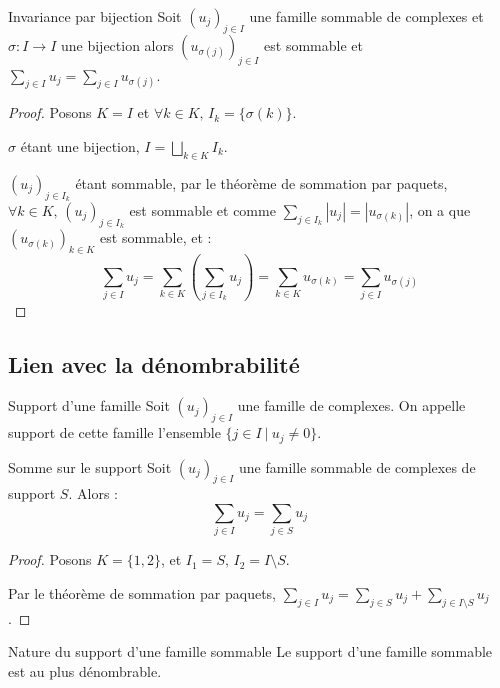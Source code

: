 \begin{theoreme}{Invariance par bijection}{}
    Soit $(u_j)_{j \in I}$ une famille sommable de complexes et $\sigma: I \to I$ une bijection 
    alors $(u_{\sigma(j)})_{j \in I}$ est sommable et $\displaystyle \sum_{j \in I} u_j = \sum_{j \in I} u_{\sigma(j)}$.
\end{theoreme}

\begin{proof}
    Posons $K = I$ et $\forall k \in K, \, I_k = \{\sigma(k)\}$.

    $\sigma$ étant une bijection, $\displaystyle I = \bigsqcup_{k \in K} I_k$.

    $(u_j)_{j \in I_k}$ étant sommable, par le théorème de sommation par paquets, 
    $\forall k \in K, \, (u_j)_{j \in I_k}$ est sommable 
    et comme $\displaystyle \sum_{j \in I_k} |u_j| = |u_{\sigma(k)}|$,
    on a que $(u_{\sigma(k)})_{k \in K}$ est sommable, et :
    \[\sum_{j \in I} u_j = \sum_{k \in K} \left( \sum_{j \in I_k} u_j \right) = \sum_{k \in K} u_{\sigma(k)} = \sum_{j \in I} u_{\sigma(j)}\]
\end{proof}

\subsection{Lien avec la dénombrabilité}

\begin{definition}{Support d'une famille}{}
    Soit $(u_j)_{j \in I}$ une famille de complexes. On appelle support de cette 
    famille l'ensemble $\{j \in I ~|~ u_j \neq 0 \}$.
\end{definition}

\begin{proposition}{Somme sur le support}{}
    Soit $(u_j)_{j \in I}$ une famille sommable de complexes de support $S$. Alors :
    \[\sum_{j \in I} u_j = \sum_{j \in S} u_j\]
\end{proposition}

\begin{proof}
    Posons $K = \{1, 2\}$, et $I_1 = S, \, I_2 = I \setminus S$.

    Par le théorème de sommation par paquets, $\displaystyle \sum_{j \in I} u_j = \sum_{j \in S} u_j + \sum_{j \in I \setminus S} u_j$.
\end{proof}

\begin{theoreme}{Nature du support d'une famille sommable}{}
    Le support d'une famille sommable est au plus dénombrable. 
\end{theoreme}

